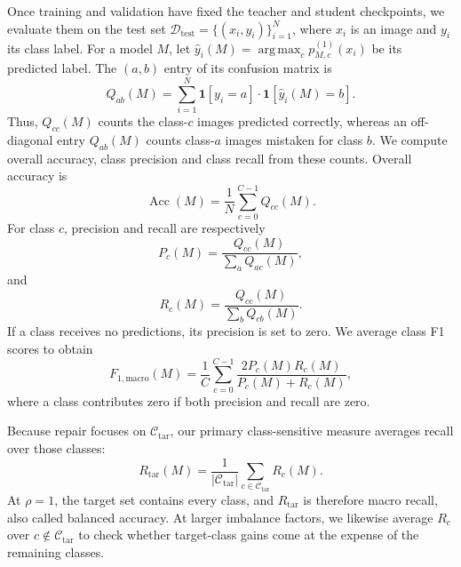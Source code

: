 \documentclass[review,number,sort&compress]{elsarticle}
\theoremstyle{definition}
\DeclareMathOperator*{\argmax}{arg\,max}
\begin{document}
Once training and validation have fixed the teacher and student
checkpoints, we evaluate them on the test set
$\mathcal{D}_{\mathrm{test}}=\{(x_i,y_i)\}_{i=1}^{N}$, where $x_i$ is
an image and $y_i$ its class label. For a model $M$, let
$\widehat y_i(M)=\argmax_c p_{M,c}^{(1)}(x_i)$ be its predicted label.
The $(a,b)$ entry of its confusion matrix is
\begin{equation}
\label{eq:confusion-entry}
Q_{ab}(M)=\sum_{i=1}^{N}
\mathbf{1}[y_i=a]\cdot\mathbf{1}[\widehat y_i(M)=b].
\end{equation}
Thus, $Q_{cc}(M)$ counts the class-$c$ images predicted correctly,
whereas an off-diagonal entry $Q_{ab}(M)$ counts class-$a$ images
mistaken for class $b$. We compute overall accuracy, class precision
and class recall from these counts. Overall accuracy is
\begin{equation}
\label{eq:overall-accuracy}
\operatorname{Acc}(M)=\frac{1}{N}\sum_{c=0}^{C-1}Q_{cc}(M).
\end{equation}
For class $c$, precision and recall are respectively
\begin{equation}
\label{eq:class-precision}
P_c(M)=\frac{Q_{cc}(M)}{\sum_a Q_{ac}(M)},
\end{equation}
and
\begin{equation}
\label{eq:class-recall}
R_c(M)=\frac{Q_{cc}(M)}{\sum_b Q_{cb}(M)}.
\end{equation}
If a class receives no predictions, its precision is set to zero.
We average class F1 scores to obtain
\begin{equation}
\label{eq:macro-f1}
F_{1,\mathrm{macro}}(M)=\frac{1}{C}
\sum_{c=0}^{C-1}\frac{2P_c(M)R_c(M)}{P_c(M)+R_c(M)},
\end{equation}
where a class contributes zero if both precision and recall are zero.

Because repair focuses on $\mathcal C_{\mathrm{tar}}$, our primary
class-sensitive measure averages recall over those classes:
\begin{equation}
\label{eq:target-recall}
R_{\mathrm{tar}}(M)=\frac{1}{|\mathcal C_{\mathrm{tar}}|}
\sum_{c\in\mathcal C_{\mathrm{tar}}}R_c(M).
\end{equation}
At $\rho=1$, the target set contains every class, and
$R_{\mathrm{tar}}$ is therefore macro recall, also called balanced
accuracy. At larger imbalance factors, we likewise average $R_c$
over $c\notin\mathcal C_{\mathrm{tar}}$ to check whether target-class
gains come at the expense of the remaining classes.
\end{document}

